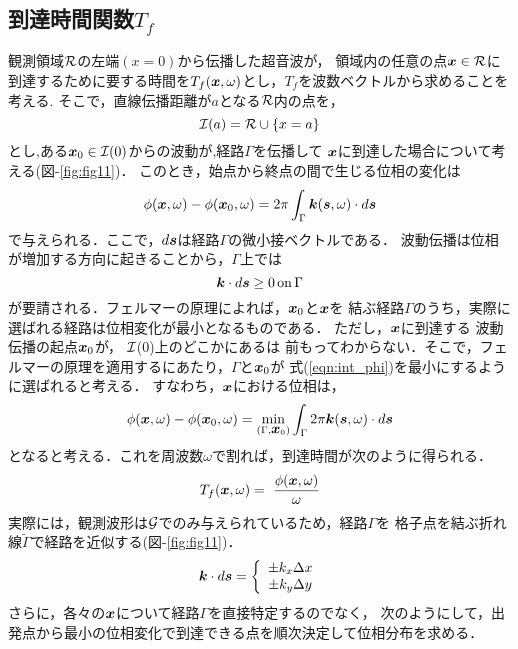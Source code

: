 \subsection{到達時間関数$T_f$}
観測領域${\cal R}$の左端$(x=0)$から伝播した超音波が，
領域内の任意の点$\fat{x}\in {\cal R}$に
到達するために要する時間を$T_f(\mbox{\boldmath{$x$}},\omega)$とし，$T_f$を波数ベクトルから求めることを考える.
そこで，直線伝播距離が$a$となる$\cal R$内の点を，
\begin{equation}
	{\cal I}(a)={\cal R} \cup \left\{ x=a\right\}
	\label{eqn:def_I0}
\end{equation}
とし,ある$\fat{x}_0\in {\cal I}(0)$からの波動が,経路$\Gamma$を伝播して
$\mbox{\boldmath{$x$}}$に到達した場合について考える(図-\ref{fig:fig11})．
このとき，始点から終点の間で生じる位相の変化は
\begin{equation}
	\phi(\fat{x},\omega)-\phi(\fat{x}_0,\omega)=
	2\pi \int_{\Gamma} \fat{k}(\fat{s},\omega)\cdot d\fat{s}
	\label{eqn:int_phi}
\end{equation}
で与えられる．ここで，$d\mbox{\boldmath{$s$}}$は経路$\Gamma$の微小接ベクトルである．
波動伝播は位相が増加する方向に起きることから，$\Gamma$上では
\begin{equation}
	\fat{k}\cdot d\fat{s}\geq 0 \, {\rm on} \, \Gamma 
	\label{eqn:}
\end{equation}
が要請される．フェルマーの原理によれば，$\mbox{\boldmath{$x$}}_0$と$\mbox{\boldmath{$x$}}$を
結ぶ経路$\Gamma$のうち，実際に選ばれる経路は位相変化が最小となるものである．
ただし，$\mbox{\boldmath{$x$}}$に到達する 波動伝播の起点$\mbox{\boldmath{$x$}}_0$が， $\cal I$(0)上のどこかにあるは
前もってわからない．そこで，フェルマーの原理を適用するにあたり，$\Gamma$と$\mbox{\boldmath{$x$}}_0$が
式(\ref{eqn:int_phi})を最小にするように選ばれると考える．
すなわち，$\mbox{\boldmath{$x$}}$における位相は，
\begin{equation}
	\phi(\fat{x},\omega) - \phi(\fat{x}_0,\omega)
	=
	\min_{\left(\Gamma, \fat{x}_0\right)}
	\int_\Gamma 2\pi \fat{k}(\fat{s},\omega) \cdot d\fat{s}
	\label{eqn:Fermat}
\end{equation}
となると考える．これを周波数$\omega$で割れば，到達時間が次のように得られる．
\begin{equation}
	T_f(\fat{x},\omega) = \
	\frac{\phi(\fat{x},\omega)}{\omega}
	\label{eqn:def_Tf}
\end{equation}
実際には，観測波形は${\cal G}$でのみ与えられているため，経路$\Gamma$を
格子点を結ぶ折れ線$\tilde \Gamma$で経路を近似する(図-\ref{fig:fig11})．
\begin{equation}
	\fat{k}\cdot d\fat{s}
	=
	\left\{
	\begin{array}{c}
		\pm k_x \Delta x \\
		\pm k_y \Delta y
	\end{array}
	\right.
	\label{eqn:}
\end{equation}
さらに，各々の$\mbox{\boldmath{$x$}}$について経路$\Gamma$を直接特定するのでなく，
次のようにして，出発点から最小の位相変化で到達できる点を順次決定して位相分布を求める．
